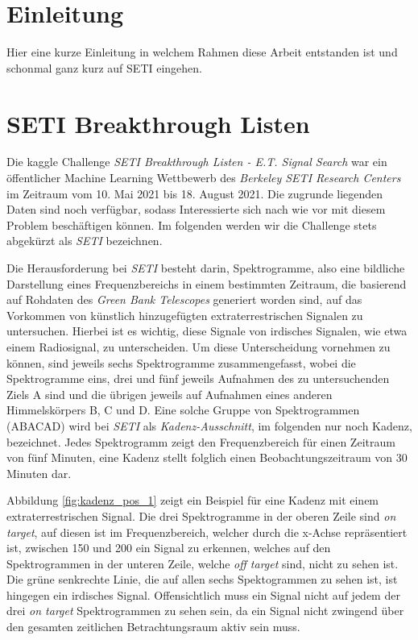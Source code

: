 \documentclass[11pt, a4paper]{article}
\begin{document}
\tableofcontents
\thispagestyle{empty}
\newpage

\section{Einleitung}
Hier eine kurze Einleitung in welchem Rahmen diese Arbeit entstanden ist und schonmal ganz kurz auf SETI eingehen.

\section{SETI Breakthrough Listen}
Die kaggle Challenge \emph{SETI Breakthrough Listen - E.T. Signal Search} war ein öffentlicher Machine Learning Wettbewerb des \emph{Berkeley SETI Research Centers} im Zeitraum vom 10. Mai 2021 bis 18. August 2021. Die zugrunde liegenden Daten sind noch verfügbar, sodass Interessierte sich nach wie vor mit diesem Problem beschäftigen können. Im folgenden werden wir die Challenge stets abgekürzt als \emph{SETI} bezeichnen. 

Die Herausforderung bei \emph{SETI} besteht darin, Spektrogramme, also eine bildliche Darstellung eines Frequenzbereichs in einem bestimmten Zeitraum, die basierend auf Rohdaten des \emph{Green Bank Telescopes} generiert worden sind, auf das Vorkommen von künstlich hinzugefügten extraterrestrischen Signalen zu untersuchen. Hierbei ist es wichtig, diese Signale von irdisches Signalen, wie etwa einem Radiosignal, zu unterscheiden. Um diese Unterscheidung vornehmen zu können, sind jeweils sechs Spektrogramme zusammengefasst, wobei die Spektrogramme eins, drei und fünf jeweils Aufnahmen des zu untersuchenden Ziels \glqq A\grqq{} sind und die übrigen jeweils auf Aufnahmen eines anderen Himmelskörpers \glqq B\grqq{}, \glqq C\grqq{} und \glqq D\grqq{}. Eine solche Gruppe von Spektrogrammen (ABACAD) wird bei \emph{SETI} als \emph{Kadenz-Ausschnitt}, im folgenden nur noch \glqq Kadenz\grqq{}, bezeichnet. Jedes Spektrogramm zeigt den Frequenzbereich für einen Zeitraum von fünf Minuten, eine Kadenz stellt folglich einen Beobachtungszeitraum von 30 Minuten dar.

Abbildung \ref{fig:kadenz_pos_1} zeigt ein Beispiel für eine Kadenz mit einem extraterrestrischen Signal. Die drei Spektrogramme in der oberen Zeile sind \emph{on target}, auf diesen ist im Frequenzbereich, welcher durch die x-Achse repräsentiert ist, zwischen 150 und 200 ein Signal zu erkennen, welches auf den Spektrogrammen in der unteren Zeile, welche \emph{off target} sind, nicht zu sehen ist. Die grüne senkrechte Linie, die auf allen sechs Spektogrammen zu sehen ist, ist hingegen ein irdisches Signal. Offensichtlich muss ein Signal nicht auf jedem der drei \emph{on target} Spektrogrammen zu sehen sein, da ein Signal nicht zwingend über den gesamten zeitlichen Betrachtungsraum aktiv sein muss.
\end{document}
